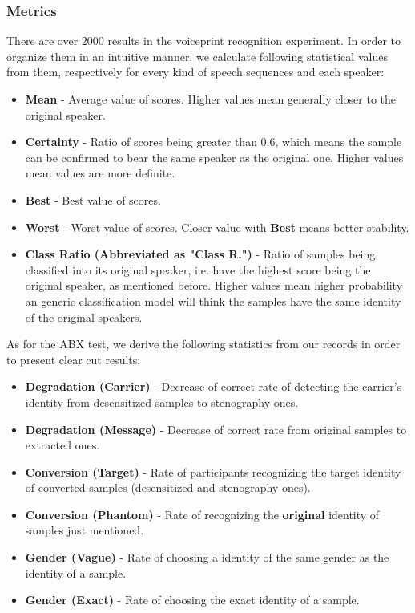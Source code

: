 \documentclass[journal]{IEEEtran} %
\begin{document}
\subsubsection{Metrics}

There are over 2000 results in the voiceprint recognition experiment. In order to organize them in an intuitive manner, we calculate following statistical values from them, respectively for every kind of speech sequences and each speaker:

\begin{itemize}
    \item \textbf{Mean} - Average value of scores. Higher values mean generally closer to the original speaker.
    \item \textbf{Certainty} - Ratio of scores being greater than 0.6, which means the sample can be confirmed to bear the same speaker as the original one. Higher values mean values are more definite.
    \item \textbf{Best} - Best value of scores.
    \item \textbf{Worst} - Worst value of scores. Closer value with \textbf{Best} means better stability.
    \item \textbf{Class Ratio (Abbreviated as "Class R.")} - Ratio of samples being classified into its original speaker, i.e. have the highest score being the original speaker, as mentioned before. Higher values mean higher probability an generic classification model will think the samples have the same identity of the original speakers.
\end{itemize}

As for the ABX test, we derive the following statistics from our records in order to present clear cut results:

\begin{itemize}
    \item \textbf{Degradation (Carrier)} - Decrease of correct rate of detecting the carrier's identity from desensitized samples to stenography ones.
    \item \textbf{Degradation (Message)} - Decrease of correct rate from original samples to extracted ones.
    \item \textbf{Conversion (Target)} - Rate of participants recognizing the target identity of converted samples (desensitized and stenography ones).
    \item \textbf{Conversion (Phantom)} - Rate of recognizing the \textbf{original} identity of samples just mentioned.
    \item \textbf{Gender (Vague)} - Rate of choosing a identity of the same gender as the identity of a sample.
    \item \textbf{Gender (Exact)} - Rate of choosing the exact identity of a sample.
\end{itemize}
\end{document}
